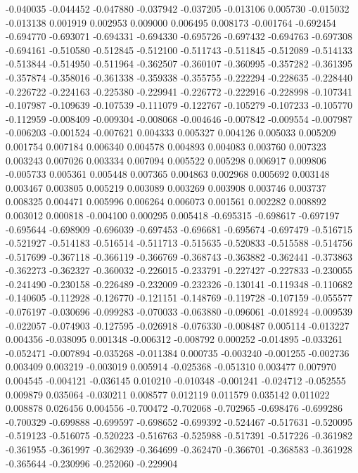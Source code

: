 -0.040035
-0.044452
-0.047880
-0.037942
-0.037205
-0.013106
0.005730
-0.015032
-0.013138
0.001919
0.002953
0.009000
0.006495
0.008173
-0.001764
-0.692454
-0.694770
-0.693071
-0.694331
-0.694330
-0.695726
-0.697432
-0.694763
-0.697308
-0.694161
-0.510580
-0.512845
-0.512100
-0.511743
-0.511845
-0.512089
-0.514133
-0.513844
-0.514950
-0.511964
-0.362507
-0.360107
-0.360995
-0.357282
-0.361395
-0.357874
-0.358016
-0.361338
-0.359338
-0.355755
-0.222294
-0.228635
-0.228440
-0.226722
-0.224163
-0.225380
-0.229941
-0.226772
-0.222916
-0.228998
-0.107341
-0.107987
-0.109639
-0.107539
-0.111079
-0.122767
-0.105279
-0.107233
-0.105770
-0.112959
-0.008409
-0.009304
-0.008068
-0.004646
-0.007842
-0.009554
-0.007987
-0.006203
-0.001524
-0.007621
0.004333
0.005327
0.004126
0.005033
0.005209
0.001754
0.007184
0.006340
0.004578
0.004893
0.004083
0.003760
0.007323
0.003243
0.007026
0.003334
0.007094
0.005522
0.005298
0.006917
0.009806
-0.005733
0.005361
0.005448
0.007365
0.004863
0.002968
0.005692
0.003148
0.003467
0.003805
0.005219
0.003089
0.003269
0.003908
0.003746
0.003737
0.008325
0.004471
0.005996
0.006264
0.006073
0.001561
0.002282
0.008892
0.003012
0.000818
-0.004100
0.000295
0.005418
-0.695315
-0.698617
-0.697197
-0.695644
-0.698909
-0.696039
-0.697453
-0.696681
-0.695674
-0.697479
-0.516715
-0.521927
-0.514183
-0.516514
-0.511713
-0.515635
-0.520833
-0.515588
-0.514756
-0.517699
-0.367118
-0.366119
-0.366769
-0.368743
-0.363882
-0.362441
-0.373863
-0.362273
-0.362327
-0.360032
-0.226015
-0.233791
-0.227427
-0.227833
-0.230055
-0.241490
-0.230158
-0.226489
-0.232009
-0.232326
-0.130141
-0.119348
-0.110682
-0.140605
-0.112928
-0.126770
-0.121151
-0.148769
-0.119728
-0.107159
-0.055577
-0.076197
-0.030696
-0.099283
-0.070033
-0.063880
-0.096061
-0.018924
-0.009539
-0.022057
-0.074903
-0.127595
-0.026918
-0.076330
-0.008487
0.005114
-0.013227
0.004356
-0.038095
0.001348
-0.006312
-0.008792
0.000252
-0.014895
-0.033261
-0.052471
-0.007894
-0.035268
-0.011384
0.000735
-0.003240
-0.001255
-0.002736
0.003409
0.003219
-0.003019
0.005914
-0.025368
-0.051310
0.003477
0.007970
0.004545
-0.004121
-0.036145
0.010210
-0.010348
-0.001241
-0.024712
-0.052555
0.009879
0.035064
-0.030211
0.008577
0.012119
0.011579
0.035142
0.011022
0.008878
0.026456
0.004556
-0.700472
-0.702068
-0.702965
-0.698476
-0.699286
-0.700329
-0.699888
-0.699597
-0.698652
-0.699392
-0.524467
-0.517631
-0.520095
-0.519123
-0.516075
-0.520223
-0.516763
-0.525988
-0.517391
-0.517226
-0.361982
-0.361955
-0.361997
-0.362939
-0.364699
-0.362470
-0.366701
-0.368583
-0.361928
-0.365644
-0.230996
-0.252060
-0.229904
